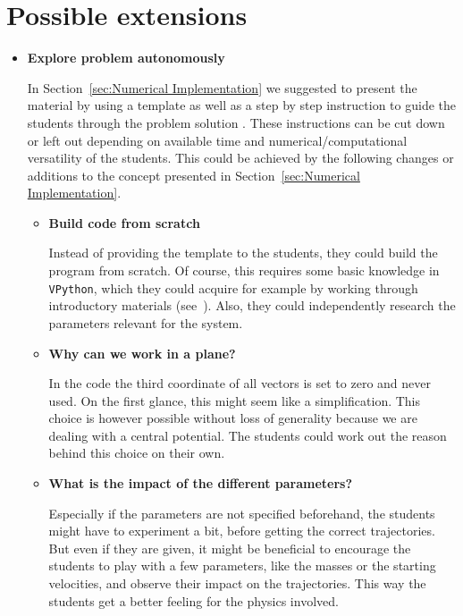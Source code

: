 \documentclass[12pt,ngerman,american]{iopart}
\newcommand{\vpython}[0]{\texttt{VPython}}
\begin{document}
\section{Possible extensions}\label{sec:extensions}

\begin{itemize}

\item \textbf{Explore problem autonomously}

In Section~\ref{sec:Numerical Implementation} we suggested to present the material by using a template as well as a step by step instruction to guide the students through the problem solution \cite{scripts}.
These instructions can be cut down or left out depending on available time and numerical/computational versatility of the students.
This could be achieved by the following changes or additions to the concept presented in Section~\ref{sec:Numerical Implementation}.

\begin{itemize}
\item \textbf{Build code from scratch}

Instead of providing the template to the students, they could build the program from scratch.
Of course, this requires some basic knowledge in \vpython{}, which they could acquire for example by working through introductory materials (see~\cite{VPython}).
Also, they could independently research the parameters relevant for the system.
\item \textbf{Why can we work in a plane?}

In the code the third coordinate of all vectors is set to zero and never used.
On the first glance, this might seem like a simplification.
This choice is however possible without loss of generality because we are dealing with a central potential.
The students could work out the reason behind this choice on their own.
\item \textbf{What is the impact of the different parameters?}

Especially if the parameters are not specified beforehand, the students might have to experiment a bit, before getting the correct trajectories.
But even if they are given, it might be beneficial to encourage the students to play with a few parameters, like the masses or the starting velocities, and observe their impact on the trajectories.
This way the students get a better feeling for the physics involved.
\end{itemize}


\end{itemize}
\end{document}
